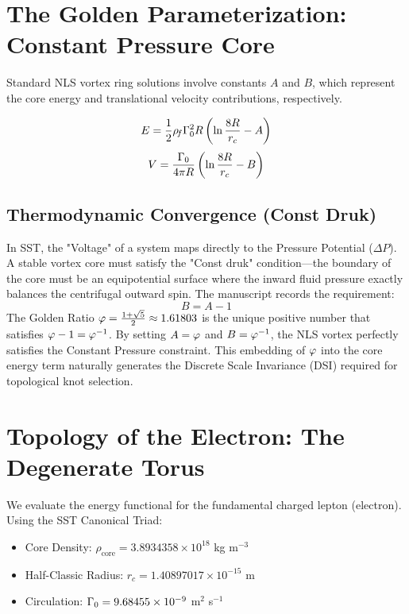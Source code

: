 \documentclass[11pt]{article}
\newcommand{\rc}{r_c}                                    %
\newcommand{\rhocore}{\rho_{\text{core}}}
\begin{document}
\section{The Golden Parameterization: Constant Pressure Core}
Standard NLS vortex ring solutions involve constants $A$ and $B$, which represent the core energy and translational velocity contributions, respectively.

\begin{equation}
    E = \frac{1}{2} \rhof \Gammazero^2 R \left( \ln \frac{8R}{\rc} - A \right)
\end{equation}
\begin{equation}
    V = \frac{\Gammazero}{4\pi R} \left( \ln \frac{8R}{\rc} - B \right)
\end{equation}

\subsection{Thermodynamic Convergence (Const Druk)}
In SST, the "Voltage" of a system maps directly to the Pressure Potential ($\Delta P$). A stable vortex core must satisfy the "Const druk" condition—the boundary of the core must be an equipotential surface where the inward fluid pressure exactly balances the centrifugal outward spin. The manuscript records the requirement:
\begin{equation}
    B = A - 1
\end{equation}
The Golden Ratio $\varphi = \frac{1+\sqrt{5}}{2} \approx 1.61803$ is the unique positive number that satisfies $\varphi - 1 = \varphi^{-1}$. By setting $A = \varphi$ and $B = \varphi^{-1}$, the NLS vortex perfectly satisfies the Constant Pressure constraint. This embedding of $\varphi$ into the core energy term naturally generates the Discrete Scale Invariance (DSI) required for topological knot selection.

\section{Topology of the Electron: The Degenerate Torus}
We evaluate the energy functional for the fundamental charged lepton (electron). Using the SST Canonical Triad:
\begin{itemize}
    \item Core Density: $\rhocore = 3.8934358 \times 10^{18}$ kg m$^{-3}$
    \item Half-Classic Radius: $\rc = 1.40897017 \times 10^{-15}$ m
    \item Circulation: $\Gamma_0 = 9.68455 \times 10^{-9}$ m$^2$ s$^{-1}$
\end{itemize}
\end{document}
